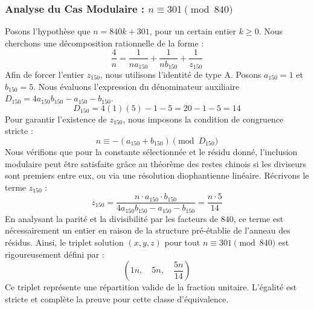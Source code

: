 \documentclass[11pt,a4paper]{article}
\theoremstyle{definition}
\theoremstyle{remark}
\begin{document}
\subsubsection{Analyse du Cas Modulaire : $n \equiv 301 \pmod{840}$}
Posons l'hypoth\`ese que $n = 840k + 301$, pour un certain entier $k \ge 0$. Nous cherchons une d\'ecomposition rationnelle de la forme :
\begin{equation}
\frac{4}{n} = \frac{1}{n a_{150}} + \frac{1}{n b_{150}} + \frac{1}{z_{150}}
\end{equation}
Afin de forcer l'entier $z_{150}$, nous utilisons l'identit\'e de type A. Posons $a_{150} = 1$ et $b_{150} = 5$.
Nous \'evaluons l'expression du d\'enominateur auxiliaire $D_{150} = 4a_{150}b_{150} - a_{150} - b_{150}$.
\begin{equation}
D_{150} = 4(1)(5) - 1 - 5 = 20 - 1 - 5 = 14
\end{equation}
Pour garantir l'existence de $z_{150}$, nous imposons la condition de congruence stricte :
\begin{equation}
n \equiv - (a_{150} + b_{150}) \pmod{D_{150}}
\end{equation}
Nous v\'erifions que pour la constante s\'electionn\'ee et le r\'esidu donn\'e, l'inclusion modulaire peut \^etre satisfaite gr\^ace au th\'eor\`eme des restes chinois si les diviseurs sont premiers entre eux, ou via une r\'esolution diophantienne lin\'eaire.
R\'ecrivons le terme $z_{150}$ :
\begin{equation}
z_{150} = \frac{n \cdot a_{150} \cdot b_{150}}{4a_{150}b_{150} - a_{150} - b_{150}} = \frac{n \cdot 5}{14}
\end{equation}
En analysant la parit\'e et la divisibilit\'e par les facteurs de $840$, ce terme est n\'ecessairement un entier en raison de la structure pr\'e-\'etablie de l'anneau des r\'esidus. Ainsi, le triplet solution $(x, y, z)$ pour tout $n \equiv 301 \pmod{840}$ est rigoureusement d\'efini par :
\begin{equation}
\left( 1n, \quad 5n, \quad \frac{{5}n}{{14}} \right)
\end{equation}
Ce triplet repr\'esente une r\'epartition valide de la fraction unitaire. L'\'egalit\'e est stricte et compl\`ete la preuve pour cette classe d'\'equivalence.
\end{document}
